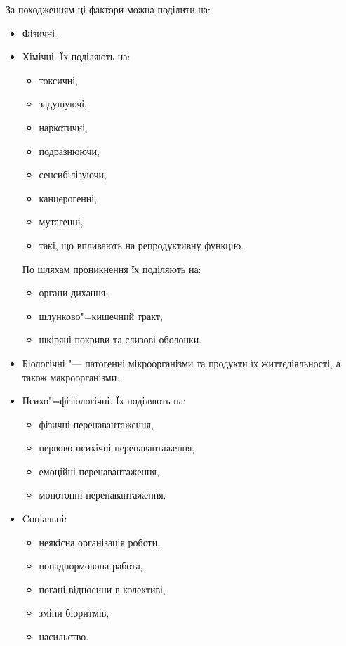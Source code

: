 \documentclass[a4paper,10pt,notitlepage,pdftex,headsepline]{scrartcl}
\begin{document}
  За походженням ці фактори можна поділити на:
  \begin{itemize}
    \item Фізичні.
    \item Хімічні.
      Їх поділяють на:
      \begin{itemize}
        \item токсичні,
        \item задушуючі,
        \item наркотичні,
        \item подразнюючи,
        \item сенсибілізуючи,
        \item канцерогенні,
        \item мутагенні,
        \item такі, що впливають на репродуктивну функцію.
      \end{itemize}

      По шляхам проникнення їх поділяють на:
      \begin{itemize}
        \item органи дихання,
        \item шлунково"=кишечний тракт,
        \item шкіряні покриви та слизові оболонки.
      \end{itemize}
    \item Біологічні "--- патогенні мікроорганізми та продукти їх
      життєдіяльності, а також макроорганізми.
    \item Психо"=фізіологічні.
      Їх поділяють на:
      \begin{itemize}
        \item фізичні перенавантаження,
        \item нервово-психічні перенавантаження,
        \item емоційні перенавантаження,
        \item монотонні перенавантаження.
      \end{itemize}
    \item Cоціальні:
      \begin{itemize}
        \item неякісна організація роботи,
        \item понаднормовона работа,
        \item погані відносини в колективі,
        \item зміни біоритмів,
        \item насильство.
      \end{itemize}
  \end{itemize}
\end{document}
